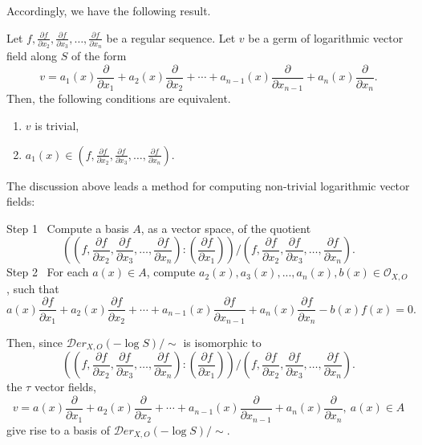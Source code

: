 \documentclass[pdftex]{arxsigma}
\begin{document}
Accordingly, we have the following result.

\begin{proposition}
Let  $ f, \frac{\partial f}{\partial x_2}, \frac{\partial f}{\partial x_3},\ldots,
\frac{\partial f}{\partial x_{n}} $ be a regular sequence. Let $ v $ be a germ of logarithmic 
vector field along $ S $ of the form 
\begin{equation*}
v= \displaystyle{a_1(x)\frac{\partial }{\partial x_1} + a_2(x)\frac{\partial}{\partial x_2} + \cdots + 
    a_{n-1}(x)\frac{\partial}{\partial x_{n-1}}+ a_n(x)\frac{\partial}{\partial x_n}}. 
\end{equation*}
 Then, the following conditions are equivalent.
\begin{enumerate}
\item[(i)\ ]$ v $ is trivial,

\item[(ii)] $ a_1(x) \in  (f, \frac{\partial f}{\partial x_2}, \frac{\partial f}{\partial x_3},\ldots,\frac{\partial f}{\partial x_{n}}).  $ \\
\end{enumerate}
\end{proposition}

The discussion above leads a method for computing non-trivial logarithmic vector fields:

\vspace{1ex}
\noindent
{\rm Step 1} \ Compute a basis $A$, as a vector space, of the quotient 
\begin{equation*}
\left(\left(f, \frac{\partial f}{\partial x_2}, \frac{\partial f}{\partial x_3},\ldots,\frac{\partial f}{\partial x_{n}}\right) : \left(\frac{\partial f}{\partial x_1}\right)\right)/\left(f, \frac{\partial f}{\partial x_2}, \frac{\partial f}{\partial x_3},\ldots,\frac{\partial f}{\partial x_{n}}\right). 
\end{equation*}
{\rm Step 2} \ For each $ a(x) \in A$, compute $ a_2(x), a_3(x),...,a_n(x), b(x)  \in {\mathcal O}_{X,O} $, such that 
\begin{equation*}
a(x)\frac{\partial f}{\partial x_1} + a_2(x)\frac{\partial f}{\partial x_2} + \cdots + a_{n-1}(x)\frac{\partial f}{\partial x_{n-1}}+ a_n(x)\frac{\partial f}{\partial x_n} - b(x)f(x) =0. 
\end{equation*}

Then, since 
$ {\mathcal Der}_{X, O}(-\log S)/\sim $ is isomorphic to 
\begin{equation*}
\left(\left(f, \frac{\partial f}{\partial x_2}, \frac{\partial f}{\partial x_3},\ldots,\frac{\partial f}{\partial x_{n}}\right) : \left(\frac{\partial f}{\partial x_1}\right)\right)/\left(f, \frac{\partial f}{\partial x_2}, \frac{\partial f}{\partial x_3},\ldots,\frac{\partial f}{\partial x_{n}}\right). 
\end{equation*}
the $ \tau$ vector fields, 
\begin{equation*}
v= a(x)\frac{\partial }{\partial x_1} + a_2(x)\frac{\partial}{\partial x_2} + \cdots +a_{n-1}(x)\frac{\partial}{\partial x_{n-1}}+ a_n(x)\frac{\partial}{\partial x_n}, \ a(x) \in A 
\end{equation*}
give rise to a basis of $ {\mathcal Der}_{X, O}(-\log S)/\sim$.
\end{document}

